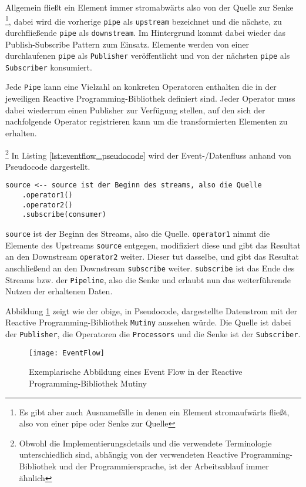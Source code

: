 Allgemein fließt ein Element immer stromabwärts also von der Quelle zur Senke
\footnote{Es gibt aber auch Ausnamefälle in denen ein Element stromaufwärts fließt, also von einer pipe oder Senke zur Quelle},
dabei wird die vorherige \verb|pipe| als \verb|upstream| bezeichnet und die nächste, zu durchfließende \verb|pipe| als \verb|downstream|.
Im Hintergrund kommt dabei wieder das Publish-Subscribe Pattern zum Einsatz. Elemente werden von einer durchlaufenen \verb|pipe| als \verb|Publisher|
veröffentlicht und von der nächsten \verb|pipe| als \verb|Subscriber| konsumiert.

Jede \verb|Pipe| kann eine Vielzahl an konkreten Operatoren enthalten die in der jeweiligen Reactive Programming-Bibliothek definiert sind.
Jeder Operator muss dabei wiederrum einen Publisher zur Verfügung stellen, auf den sich der nachfolgende Operator registrieren kann
um die transformierten Elementen zu erhalten.

\footnote{Obwohl die Implementierungsdetails und die verwendete Terminologie unterschiedlich sind, abhängig von der verwendeten Reactive Programming-Bibliothek
    und der Programmiersprache, ist der Arbeitsablauf immer ähnlich}
In Listing \ref{lst:eventflow_pseudocode} wird der Event-/Datenfluss anhand von Pseudocode dargestellt.
\begin{lstlisting}[caption=Pseudocode Event-/Datenfluss, captionpos=b, label=lst:eventflow_pseudocode]
source <-- source ist der Beginn des streams, also die Quelle
	.operator1() 
	.operator2() 
	.subscribe(consumer)
\end{lstlisting}
\verb|source| ist der Beginn des Streams, also die Quelle. \verb|operator1| nimmt die Elemente des Upstreams \verb|source| entgegen,
modifiziert diese und gibt das Resultat an den Downstream \verb|operator2| weiter.
Dieser tut dasselbe, und gibt das Resultat anschließend an den Downstream \verb|subscribe| weiter.
\verb|subscribe| ist das Ende des Streams bzw. der \verb|Pipeline|, also die Senke und erlaubt nun das weiterführende Nutzen der erhaltenen Daten.


Abbildung \ref{fig:eventflow_mutiny} zeigt wie der obige, in Pseudocode, dargestellte Datenstrom
mit der Reactive Programming-Bibliothek \verb|Mutiny| aussehen würde.
Die Quelle ist dabei der \verb|Publisher|, die Operatoren die \verb|Processors| und die Senke ist der \verb|Subscriber|.

\begin{figure}[ht!]
    \centering
    \texttt{[image: EventFlow]}
    \caption{Exemplarische Abbildung eines Event Flow in der Reactive Programming-Bibliothek Mutiny \parencite{MutinyEventFlow}}
    \label{fig:eventflow_mutiny}
\end{figure}

